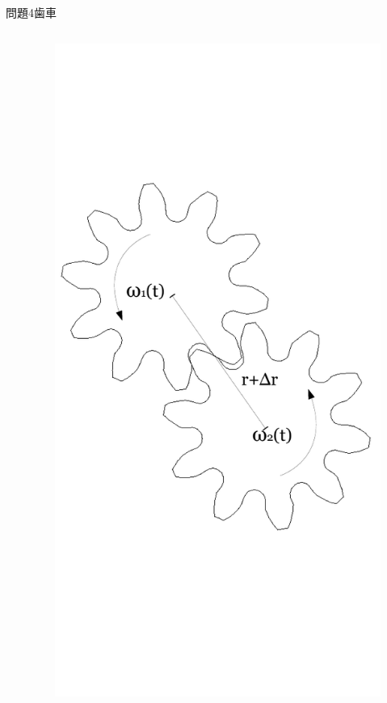 \documentclass[dvipdfmx]{beamer}
\begin{document}
\begin{frame}{問題4}{歯車}
\begin{columns}[t]
\begin{column}{0.7\textwidth}
\end{column}
\begin{column}{0.3\textwidth}
\begin{figure}[htbp]
    \centering
    \includegraphics[bb=0mm 0mm 100.0mm 170.0mm, scale=0.35, type=pdf]{img/problem4.pdf}
\end{figure}
\end{column}
\end{columns}
\end{frame}
\end{document}
